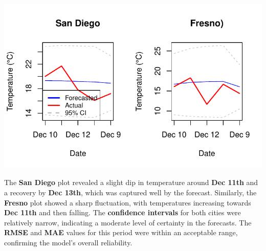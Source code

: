 \documentclass[
  11pt,
]{article}
\newenvironment{Shaded}{\begin{snugshade}}{\end{snugshade}}
\newcommand{\AttributeTok}[1]{\textcolor[rgb]{0.40,0.45,0.13}{#1}}
\newcommand{\CommentTok}[1]{\textcolor[rgb]{0.37,0.37,0.37}{#1}}
\newcommand{\DecValTok}[1]{\textcolor[rgb]{0.68,0.00,0.00}{#1}}
\newcommand{\FunctionTok}[1]{\textcolor[rgb]{0.28,0.35,0.67}{#1}}
\newcommand{\NormalTok}[1]{\textcolor[rgb]{0.00,0.23,0.31}{#1}}
\newcommand{\SpecialCharTok}[1]{\textcolor[rgb]{0.37,0.37,0.37}{#1}}
\newcommand{\StringTok}[1]{\textcolor[rgb]{0.13,0.47,0.30}{#1}}
\begin{document}
\begin{Shaded}
\end{Shaded}

\includegraphics{project_files/figure-pdf/unnamed-chunk-91-1.pdf}

The \textbf{San Diego} plot revealed a slight dip in temperature around
\textbf{Dec 11th} and a recovery by \textbf{Dec 13th}, which was
captured well by the forecast. Similarly, the \textbf{Fresno} plot
showed a sharp fluctuation, with temperatures increasing towards
\textbf{Dec 11th} and then falling. The \textbf{confidence intervals}
for both cities were relatively narrow, indicating a moderate level of
certainty in the forecasts. The \textbf{RMSE} and \textbf{MAE} values
for this period were within an acceptable range, confirming the model's
overall reliability.
\end{document}
